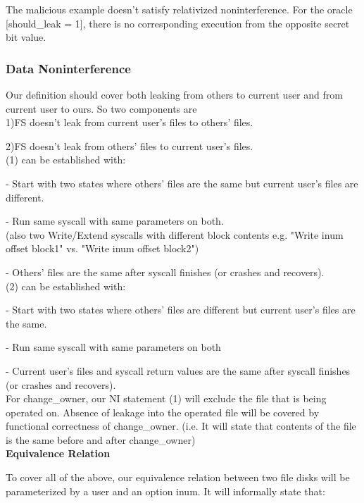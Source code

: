 \documentclass[onecolumn]{paper}
\begin{document}
			The malicious example doesn’t satisfy relativized noninterference. For the oracle [should\_leak = 1], there is no corresponding execution from the opposite secret bit value.
			
			\subsubsection{Data Noninterference}
			
			Our definition should cover both leaking from others to current user and from current user to ours. So two components are\\
			
			1)FS doesn't leak from current user's files to others' files.
			
			2)FS doesn't leak from others' files to current user's files.\\
			
			
			(1) can be established with:
			
			- Start with two states where others' files are the same but current user's files are different.
			
			- Run same syscall with same parameters on both.\\ 
			(also two Write/Extend syscalls with different block contents 
			e.g. "Write inum offset block1" vs. "Write inum offset block2")
			
			- Others' files are the same after syscall finishes (or crashes and recovers).\\
			
			(2) can be established with:
			
			- Start with two states where others' files are different but current user's files are the same.
			
			- Run same syscall with same parameters on both
			
			- Current user's files and syscall return values are the same after syscall finishes (or crashes and recovers).\\
			
			For change\_owner, our NI statement (1) will exclude the file that is being operated on. 
			Absence of leakage into the operated file will be covered by functional correctness of change\_owner.
			(i.e. It will state that contents of the file is the same before and after change\_owner)\\
			
			
			{\bf Equivalence Relation}
			
			To cover all of the above, our equivalence relation between two file disks will be parameterized by a user and an option inum.
			It will informally state that:\\
			
\end{document}
